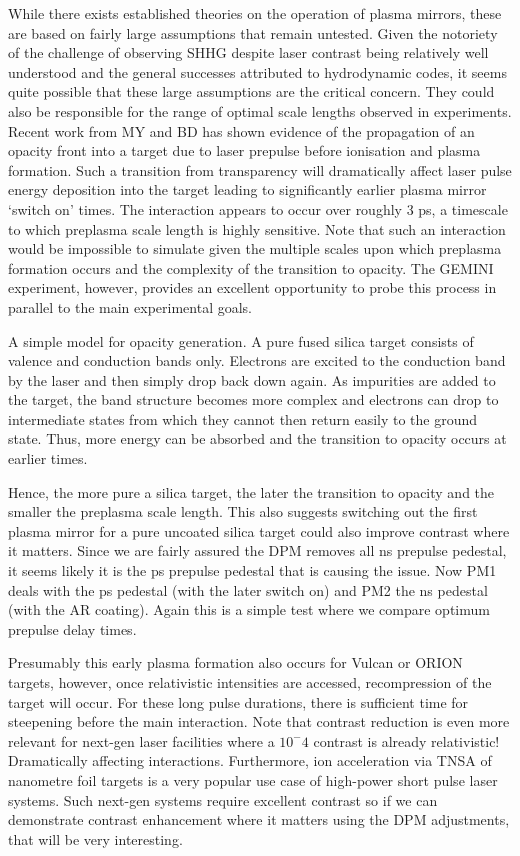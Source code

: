 While there exists established theories on the operation of plasma mirrors, these are based on fairly large assumptions that remain untested. Given the notoriety of the challenge of observing SHHG despite laser contrast being relatively well understood and the general successes attributed to hydrodynamic codes, it seems quite possible that these large assumptions are the critical concern. They could also be responsible for the range of optimal scale lengths observed in experiments. Recent work from MY and BD has shown evidence of the propagation of an opacity front into a target due to laser prepulse before ionisation and plasma formation. Such a transition from transparency will dramatically affect laser pulse energy deposition into the target leading to significantly earlier plasma mirror `switch on' times. The interaction appears to occur over roughly 3 ps, a timescale to which preplasma scale length is highly sensitive. Note that such an interaction would be impossible to simulate given the multiple scales upon which preplasma formation occurs and the complexity of the transition to opacity. The GEMINI experiment, however, provides an excellent opportunity to probe this process in parallel to the main experimental goals.

A simple model for opacity generation. A pure fused silica target consists of valence and conduction bands only. Electrons are excited to the conduction band by the laser and then simply drop back down again. As impurities are added to the target, the band structure becomes more complex and electrons can drop to intermediate states from which they cannot then return easily to the ground state. Thus, more energy can be absorbed and the transition to opacity occurs at earlier times.

Hence, the more pure a silica target, the later the transition to opacity and the smaller the preplasma scale length. This also suggests switching out the first plasma mirror for a pure uncoated silica target could also improve contrast where it matters. Since we are fairly assured the DPM removes all ns prepulse pedestal, it seems likely it is the ps prepulse pedestal that is causing the issue. Now PM1 deals with the ps pedestal (with the later switch on) and PM2 the ns pedestal (with the AR coating). Again this is a simple test where we compare optimum prepulse delay times.

Presumably this early plasma formation also occurs for Vulcan or ORION targets, however, once relativistic intensities are accessed, recompression of the target will occur. For these long pulse durations, there is sufficient time for steepening before the main interaction. Note that contrast reduction is even more relevant for next-gen laser facilities where a $10^-4$ contrast is already relativistic! Dramatically affecting interactions. Furthermore, ion acceleration via TNSA of nanometre foil targets is a very popular use case of high-power short pulse laser systems. Such next-gen systems require excellent contrast so if we can demonstrate contrast enhancement where it matters using the DPM adjustments, that will be very interesting.

